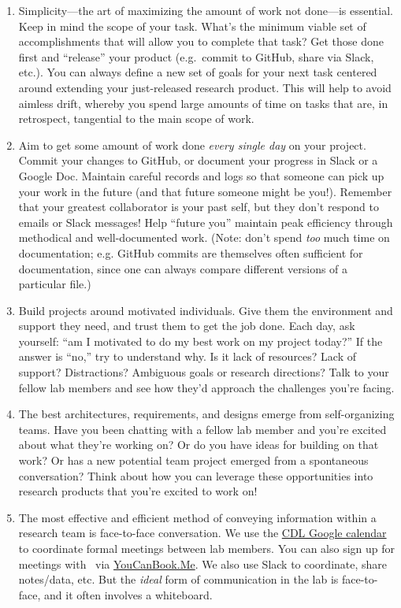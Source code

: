 \documentclass{tufte-book} %
\begin{document}
\begin{enumerate}
\item Simplicity---the art of maximizing the amount of work not
  done---is essential.  Keep in mind the scope of your task.  What's
  the minimum viable set of accomplishments that will allow you to
  complete that task?  Get those done first and ``release'' your
  product (e.g.\ commit to GitHub, share via Slack, etc.).  You can
  always define a new set of goals for your next task centered around
  extending your just-released research product.  This will help to
  avoid aimless drift, whereby you spend large amounts of time on
  tasks that are, in retrospect, tangential to the main scope of work.

\item Aim to get some amount of work done \textit{every single day} on
  your project.  Commit your changes to GitHub, or document your
  progress in Slack or a Google Doc.  Maintain careful records and
  logs so that someone can pick up your work in the future (and that
  future someone might be you!).  Remember that your greatest
  collaborator is your past self, but they don't respond to emails or
  Slack messages!  Help ``future you'' maintain peak efficiency
  through methodical and well-documented work.  (Note: don't spend
  \textit{too} much time on documentation; e.g. GitHub commits are
  themselves often sufficient for documentation, since one can always
  compare different versions of a particular file.)

\item Build projects around motivated individuals.  Give them the
  environment and support they need, and trust them to get the job
  done.  Each day, ask yourself: ``am I motivated to do my best work
  on my project today?''  If the answer is ``no,'' try to understand
  why.  Is it lack of resources?  Lack of support?  Distractions?
  Ambiguous goals or research directions?  Talk to your fellow lab
  members and see how they'd approach the challenges you're facing.

\item The best architectures, requirements, and designs emerge from
  self-organizing teams.  Have you been chatting with a fellow lab
  member and you're excited about what they're working on?  Or do you
  have ideas for building on that work?  Or has a new potential team
  project emerged from a spontaneous conversation?  Think about how
  you can leverage these opportunities into research products that
  you're excited to work on!

\item The most effective and efficient method of conveying information
  within a research team is face-to-face conversation.  We use the
  \hyperref[sec: scheduling]{CDL Google calendar} to coordinate formal
  meetings between lab members.  You can also sign up for meetings
  with \director~via
  \href{https://context-lab.youcanbook.me/}{YouCanBook.Me}.  We also
  use Slack to coordinate, share notes/data, etc.  But the
  \textit{ideal} form of communication in the lab is face-to-face, and
  it often involves a whiteboard.


\end{enumerate}
\end{document}
